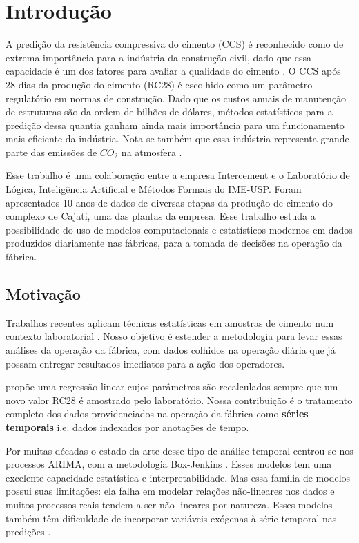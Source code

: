 \chapter{Introdução}
\label{cap:introducao}


A predição da resistência compressiva do cimento (CCS) é reconhecido como de
extrema importância para a indústria da construção civil, dado que essa
capacidade é um dos fatores para avaliar a qualidade do cimento
\citep{cementml}. O CCS após 28 dias da produção do cimento (RC28) é escolhido
 como um parâmetro regulatório em normas de construção. Dado que os custos
 anuais de manutenção de estruturas são da ordem de bilhões de dólares, métodos
 estatísticos para a predição dessa quantia ganham ainda mais importância para um
 funcionamento mais eficiente da indústria. Nota-se também que essa  
 indústria representa grande parte das emissões de $CO_2$ na atmosfera \citep{cementroadmap}.

Esse trabalho é uma colaboração entre a empresa Intercement e o Laboratório de
Lógica, Inteligência Artificial e Métodos Formais do IME-USP. Foram apresentados
10 anos de dados de diversas etapas da produção de cimento do complexo de
Cajati, uma das plantas da empresa. Esse trabalho estuda a possibilidade do uso
de modelos computacionais e estatísticos modernos em dados produzidos diariamente nas fábricas,
para a tomada de decisões na operação da fábrica.


\section {Motivação}



Trabalhos recentes aplicam técnicas estatísticas em amostras de cimento num
contexto laboratorial \citep{cementlin,nncement}.
Nosso objetivo é estender a metodologia para
levar essas análises da operação da fábrica, com dados colhidos na operação diária que já
possam entregar resultados imediatos para a ação dos operadores.

\citep{dynstat} propõe uma regressão linear cujos parâmetros são recalculados
sempre que um novo valor RC28 é amostrado pelo laboratório. Nossa contribuição é
o tratamento completo dos dados providenciados na operação da fábrica como
\textbf{séries temporais} i.e. dados indexados por anotações de tempo.

Por muitas décadas o estado da arte desse tipo de análise temporal centrou-se
nos processos ARIMA, com a metodologia Box-Jenkins \citep{arima}.
Esses modelos tem uma excelente capacidade estatística e interpretabilidade.
Mas essa família de modelos possui suas limitações:
ela falha em modelar relações não-lineares nos dados \citep{forecasting} e 
muitos processos reais tendem a ser não-lineares por natureza.
Esses modelos também têm dificuldade de incorporar variáveis exógenas à série temporal nas predições \citep{ubertime}.


